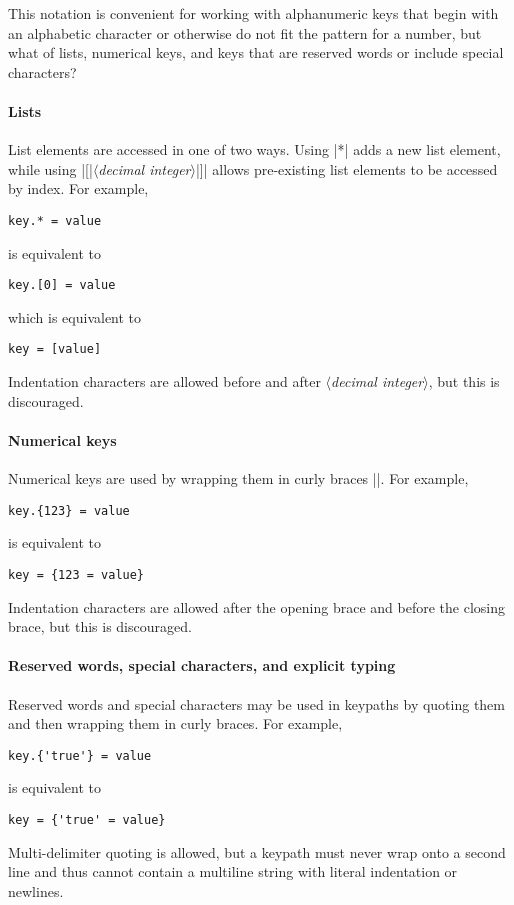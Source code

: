 \documentclass[11pt]{article}
\newcommand{\vmeta}[1]{{\color{DarkRed}\ensuremath{\langle}\textit{#1}\ensuremath{\rangle}}}
\begin{document}
{{This notation is convenient for working with alphanumeric keys that begin with an alphabetic character or otherwise do not fit the pattern for a number, but what of lists, numerical keys, and keys that are reserved words or include special characters?

\paragraph{Lists}

List elements are accessed in one of two ways.  Using |*| adds a new list element, while using |[|\vmeta{decimal integer}|]| allows pre-existing list elements to be accessed by index.  For example,
\begin{Verbatim}
key.* = value
\end{Verbatim}
is equivalent to
\begin{Verbatim}
key.[0] = value
\end{Verbatim}
which is equivalent to
\begin{Verbatim}
key = [value]
\end{Verbatim}
Indentation characters are allowed before and after \vmeta{decimal integer}, but this is discouraged.


\paragraph{Numerical keys}

Numerical keys are used by wrapping them in curly braces |{}|.  For example,
\begin{Verbatim}
key.{123} = value
\end{Verbatim}
is equivalent to 
\begin{Verbatim}
key = {123 = value}
\end{Verbatim}
Indentation characters are allowed after the opening brace and before the closing brace, but this is discouraged.

\paragraph{Reserved words, special characters, and explicit typing}

Reserved words and special characters may be used in keypaths by quoting them and then wrapping them in curly braces.  For example,
\begin{Verbatim}
key.{'true'} = value
\end{Verbatim}
is equivalent to 
\begin{Verbatim}
key = {'true' = value}
\end{Verbatim}
Multi-delimiter quoting is allowed, but a keypath must never wrap onto a second line and thus cannot contain a multiline string with literal indentation or newlines.

}}
\end{document}
